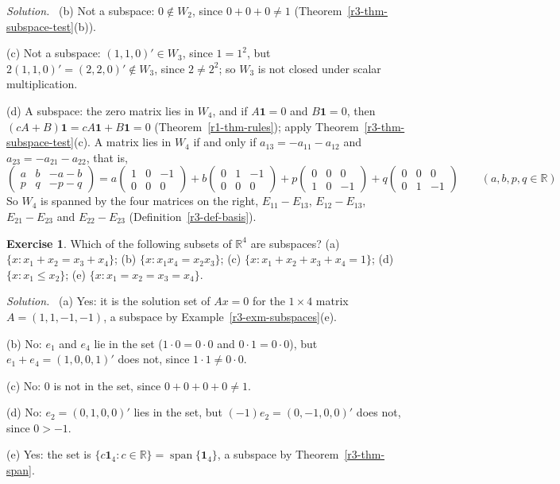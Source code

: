 \documentclass[12pt]{article}
\newcommand{\R}{\mathbb R}
\newcommand{\one}{\mathbf 1}
\DeclareMathOperator{\Span}{span}
\theoremstyle{definition}
\newtheorem{exercise}{Exercise}
\newenvironment{solution}{\par\noindent\textit{Solution.}\ }{\par\smallskip}
\begin{document}
\begin{solution}
(b) Not a subspace: \(0\notin W_2\), since \(0+0+0\ne1\) (Theorem~\ref{r3-thm-subspace-test}(b)).

(c) Not a subspace: \((1,1,0)'\in W_3\), since \(1=1^2\), but \(2(1,1,0)'=(2,2,0)'\notin W_3\), since
\(2\ne2^2\); so \(W_3\) is not closed under scalar multiplication.

(d) A subspace: the zero matrix lies in \(W_4\), and if \(A\one=0\) and \(B\one=0\), then
\((cA+B)\one=cA\one+B\one=0\) (Theorem~\ref{r1-thm-rules}); apply Theorem~\ref{r3-thm-subspace-test}(c).
A matrix lies in \(W_4\) if and only if \(a_{13}=-a_{11}-a_{12}\) and \(a_{23}=-a_{21}-a_{22}\), that is,
\[
\begin{pmatrix}a&b&-a-b\\p&q&-p-q\end{pmatrix}=a\begin{pmatrix}1&0&-1\\0&0&0\end{pmatrix}+b\begin{pmatrix}0&1&-1\\0&0&0\end{pmatrix}
+p\begin{pmatrix}0&0&0\\1&0&-1\end{pmatrix}+q\begin{pmatrix}0&0&0\\0&1&-1\end{pmatrix}\qquad(a,b,p,q\in\R)
\]
So \(W_4\) is spanned by the four matrices on the right, \(E_{11}-E_{13}\), \(E_{12}-E_{13}\),
\(E_{21}-E_{23}\) and \(E_{22}-E_{23}\) (Definition~\ref{r3-def-basis}).
\end{solution}

\begin{exercise}\label{r3-ex-which-subspaces}
Which of the following subsets of \(\R^4\) are subspaces?
(a) \(\{x:x_1+x_2=x_3+x_4\}\);
(b) \(\{x:x_1x_4=x_2x_3\}\);
(c) \(\{x:x_1+x_2+x_3+x_4=1\}\);
(d) \(\{x:x_1\leqslant x_2\}\);
(e) \(\{x:x_1=x_2=x_3=x_4\}\).
\end{exercise}
\begin{solution}
(a) Yes: it is the solution set of \(Ax=0\) for the \(1\times4\) matrix \(A=(1,1,-1,-1)\),
a subspace by Example~\ref{r3-exm-subspaces}(e).

(b) No: \(e_1\) and \(e_4\) lie in the set (\(1\cdot0=0\cdot0\) and \(0\cdot1=0\cdot0\)), but
\(e_1+e_4=(1,0,0,1)'\) does not, since \(1\cdot1\ne0\cdot0\).

(c) No: \(0\) is not in the set, since \(0+0+0+0\ne1\).

(d) No: \(e_2=(0,1,0,0)'\) lies in the set, but \((-1)e_2=(0,-1,0,0)'\) does not, since
\(0>-1\).

(e) Yes: the set is \(\{c\one_4:c\in\R\}=\Span\{\one_4\}\), a subspace by
Theorem~\ref{r3-thm-span}.
\end{solution}
\end{document}
